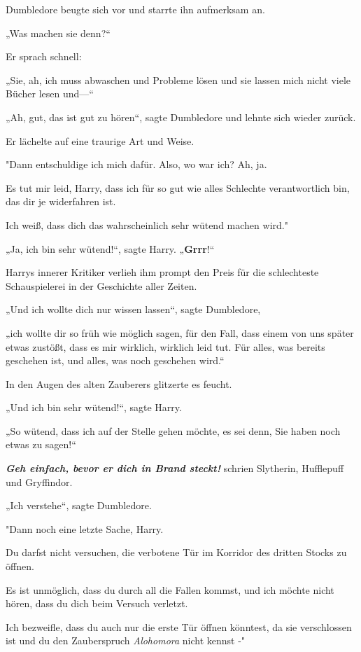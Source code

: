{Dumbledore beugte sich vor und starrte ihn aufmerksam an.

„Was machen sie denn?“

Er sprach schnell:

„Sie, ah, ich muss abwaschen und Probleme lösen und sie lassen mich nicht viele Bücher lesen und—“

„Ah, gut, das ist gut zu hören“, sagte Dumbledore und lehnte sich wieder zurück.

Er lächelte auf eine traurige Art und Weise.

"Dann entschuldige ich mich dafür. Also, wo war ich? Ah, ja.

Es tut mir leid, Harry, dass ich für so gut wie alles Schlechte verantwortlich bin, das dir je widerfahren ist.

Ich weiß, dass dich das wahrscheinlich sehr wütend machen wird."

„Ja, ich bin sehr wütend!“, sagte Harry. „\textbf{Grrr}!“

Harrys innerer Kritiker verlieh ihm prompt den Preis für die schlechteste Schauspielerei in der Geschichte aller Zeiten.

„Und ich wollte dich nur wissen lassen“, sagte Dumbledore,

„ich wollte dir so früh wie möglich sagen, für den Fall, dass einem von uns später etwas zustößt, dass es mir wirklich, wirklich leid tut. Für alles, was bereits geschehen ist, und alles, was noch geschehen wird.“

In den Augen des alten Zauberers glitzerte es feucht.

„Und ich bin sehr wütend!“, sagte Harry.

„So wütend, dass ich auf der Stelle gehen möchte, es sei denn, Sie haben noch etwas zu sagen!“

\textbf{\emph{Geh einfach, bevor er dich in Brand steckt!}} schrien Slytherin, Hufflepuff und Gryffindor.

„Ich verstehe“, sagte Dumbledore.

"Dann noch eine letzte Sache, Harry.

Du darfst nicht versuchen, die verbotene Tür im Korridor des dritten Stocks zu öffnen.

Es ist unmöglich, dass du durch all die Fallen kommst, und ich möchte nicht hören, dass du dich beim Versuch verletzt.

Ich bezweifle, dass du auch nur die erste Tür öffnen könntest, da sie verschlossen ist und du den Zauberspruch \emph{Alohomora} nicht kennst -"

}
